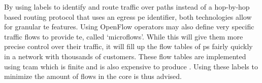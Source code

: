 By using labels to identify and route traffic over paths instead of a hop-by-hop based routing protocol that uses an egress \ac{pe} identifier, both technologies allow for granular \ac{te} features. 
%
Using OpenFlow operators may also define very specific traffic flows to provide \ac{te}, called `microflows'. While this will give them more precise control over their traffic, it will fill up the flow tables of \acp{p} fairly quickly in a network with thousands of customers. These flow tables are implemented using \ac{tcam} which is finite and is also expensive to produce \cite{tcam}. Using these labels to minimize the amount of flows in the core is thus advised.


